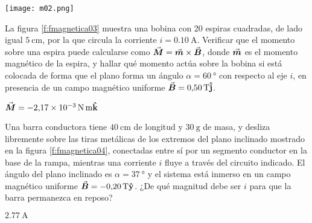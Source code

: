 \begin{minipage}[t]{0.5\textwidth}
  \centering
  \texttt{[image: m02.png]}
\end{minipage}
%
\begin{Exercise}\label{p:fmagnetica03}
  La figura \ref{f:fmagnetica03} muestra una bobina con 20 espiras cuadradas, de lado igual $\SI{5}{\centi\metre}$, por la que circula la corriente $i = \SI{0.10}{\ampere}$. Verificar que el momento sobre una espira puede calcularse como $\va*{M} = \va*{m} \times \va*{B}$, donde $\va*{m}$ es el momento magnético de la espira, y hallar qué momento actúa sobre la bobina si está colocada de forma que el plano forma un ángulo $\alpha = \SI{60}{\degree}$ con respecto al eje $i$, en presencia de un campo magnético uniforme $\va*{B} = \SI{0.50}{\tesla}\vu{j}$.
\end{Exercise}
\begin{Answer}
  $\va*{M} = \SI{-2.17E-3}{\newton . \metre}\vu{k}$
\end{Answer}
%
\begin{Exercise}\label{p:fmagnetica04}
  Una barra conductora tiene $\SI{40}{\centi\metre}$ de longitud y $\SI{30}{\gram}$ de masa, y desliza libremente sobre las tiras metálicas de los extremos del plano inclinado mostrado en la figura \ref{f:fmagnetica04}, conectadas entre sí por un segmento conductor en la base de la rampa, mientras una corriente $i$ fluye a través del circuito indicado. El ángulo del plano inclinado es $\alpha = \SI{37}{\degree}$ y el sistema está inmerso en un campo magnético uniforme $\va*{B} = \SI{-0.20}{\tesla}\vu{y}$. ¿De qué magnitud debe ser $i$ para que la barra permanezca en reposo?
\end{Exercise}
\begin{Answer}
  $\SI{2.77}{\ampere}$
\end{Answer}
%
\noindent
